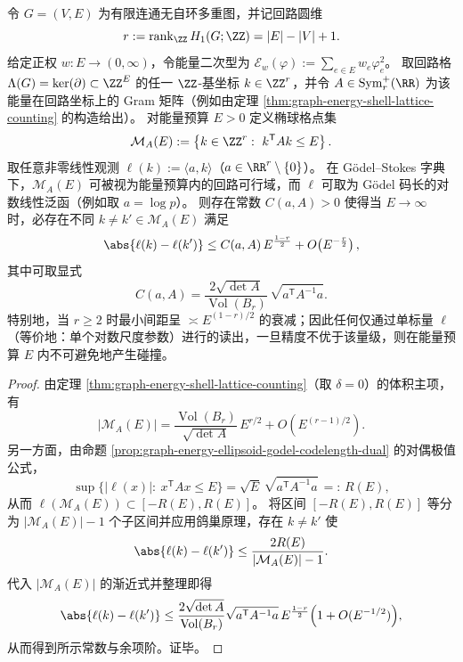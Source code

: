 \begin{theorem}\label{thm:spg-stokes-godel-ellipsoid-min-spacing-single-gate}
令 \(G=(V,E)\) 为有限连通无自环多重图，并记回路圆维
\[
r:=\operatorname{rank}_{\ZZ}H_1(G;\ZZ)=|E|-|V|+1.
\]
给定正权 \(w:E\to(0,\infty)\)，令能量二次型为
\(
\mathcal E_w(\varphi):=\sum_{e\in E}w_e\varphi_e^2
\)。
取回路格 \(\Lambda(G)=\ker(\partial)\subset \ZZ^{E}\) 的任一 \(\ZZ\)-基坐标 \(k\in\ZZ^r\)，并令 \(A\in\mathrm{Sym}_r^{+}(\RR)\) 为该能量在回路坐标上的 Gram 矩阵（例如由定理 \ref{thm:graph-energy-shell-lattice-counting} 的构造给出）。
对能量预算 \(E>0\) 定义椭球格点集
\[
\mathcal M_A(E):=\left\{k\in\ZZ^r:\ k^{\mathsf T}Ak\le E\right\}.
\]
取任意非零线性观测 \(\ell(k):=\langle a,k\rangle\)（\(a\in\RR^r\setminus\{0\}\)）。
在 Gödel--Stokes 字典下，\(\mathcal M_A(E)\) 可被视为能量预算内的回路可行域，而 \(\ell\) 可取为 Gödel 码长的对数线性泛函（例如取 \(a=\log p\)）。
则存在常数 \(C(a,A)>0\) 使得当 \(E\to\infty\) 时，必存在不同 \(k\neq k'\in\mathcal M_A(E)\) 满足
\[
\abs{\ell(k)-\ell(k')}
\le
C(a,A)\,E^{\frac{1-r}{2}}+O\!\left(E^{-\frac r2}\right),
\]
其中可取显式
\[
C(a,A)=\frac{2\sqrt{\det A}}{\operatorname{Vol}(B_r)}\,
\sqrt{a^{\mathsf T}A^{-1}a}.
\]
特别地，当 \(r\ge 2\) 时最小间距呈 \(\asymp E^{(1-r)/2}\) 的衰减；因此任何仅通过单标量 \(\ell\)（等价地：单个对数尺度参数）进行的读出，一旦精度不优于该量级，则在能量预算 \(E\) 内不可避免地产生碰撞。
\end{theorem}
\begin{proof}
由定理 \ref{thm:graph-energy-shell-lattice-counting}（取 \(\delta=0\)）的体积主项，有
\[
|\mathcal M_A(E)|
=
\frac{\operatorname{Vol}(B_r)}{\sqrt{\det A}}\,E^{r/2}
+O\!\left(E^{(r-1)/2}\right).
\]
另一方面，由命题 \ref{prop:graph-energy-ellipsoid-godel-codelength-dual} 的对偶极值公式，
\[
\sup\{|\ell(x)|:\ x^{\mathsf T}Ax\le E\}
=
\sqrt E\,\sqrt{a^{\mathsf T}A^{-1}a}
\,=:\,R(E),
\]
从而 \(\ell(\mathcal M_A(E))\subset[-R(E),R(E)]\)。
将区间 \([-R(E),R(E)]\) 等分为 \(|\mathcal M_A(E)|-1\) 个子区间并应用鸽巢原理，存在 \(k\neq k'\) 使
\[
\abs{\ell(k)-\ell(k')}
\le
\frac{2R(E)}{|\mathcal M_A(E)|-1}.
\]
代入 \(|\mathcal M_A(E)|\) 的渐近式并整理即得
\[
\abs{\ell(k)-\ell(k')}
\le
\frac{2\sqrt{\det A}}{\operatorname{Vol}(B_r)}\sqrt{a^{\mathsf T}A^{-1}a}\,E^{\frac{1-r}{2}}
\Bigl(1+O(E^{-1/2})\Bigr),
\]
从而得到所示常数与余项阶。证毕。
\end{proof}

